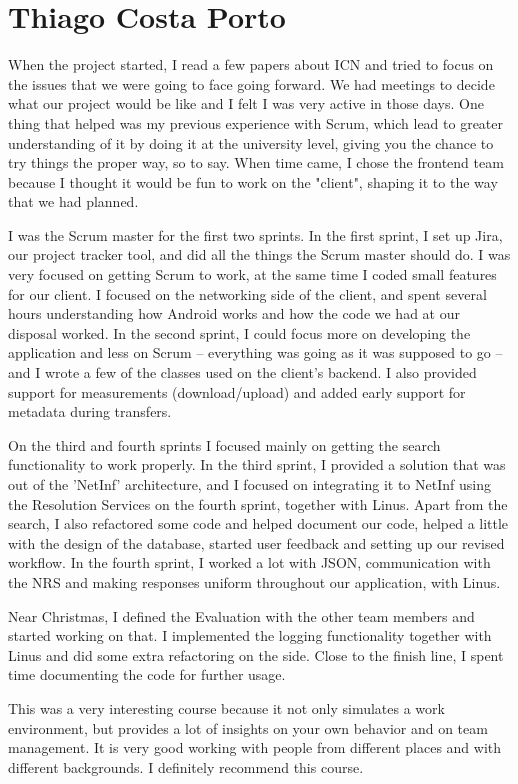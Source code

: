 \section{Thiago Costa Porto}
When the project started, I read a few papers about ICN and tried to focus on the issues that we were going to face going forward. We had meetings to decide what our project would be like and I felt I was very active in those days. One thing that helped was my previous experience with Scrum, which lead to greater understanding of it by doing it at the university level, giving you the chance to try things the proper way, so to say. When time came, I chose the frontend team because I thought it would be fun to work on the "client", shaping it to the way that we had planned.

I was the Scrum master for the first two sprints. In the first sprint, I set up Jira, our project tracker tool, and did all the things the Scrum master should do. I was very focused on getting Scrum to work, at the same time I coded small features for our client. I focused on the networking side of the client, and spent several hours understanding how Android works and how the code we had at our disposal worked. In the second sprint, I could focus more on developing the application and less on Scrum -- everything was going as it was supposed to go -- and I wrote a few of the classes used on the client's backend. I also provided support for measurements (download/upload) and added early support for metadata during transfers.

On the third and fourth sprints I focused mainly on getting the search functionality to work properly. In the third sprint, I provided a solution that was out of the 'NetInf' architecture, and I focused on integrating it to NetInf using the Resolution Services on the fourth sprint, together with Linus. Apart from the search, I also refactored some code and helped document our code, helped a little with the design of the database, started user feedback and setting up our revised workflow. In the fourth sprint, I worked a lot with JSON, communication with the NRS and making responses uniform throughout our application, with Linus.

Near Christmas, I defined the Evaluation with the other team members and started working on that. I implemented the logging functionality together with Linus and did some extra refactoring on the side. Close to the finish line, I spent time documenting the code for further usage.

This was a very interesting course because it not only simulates a work environment, but provides a lot of insights on your own behavior and on team management. It is very good working with people from different places and with different backgrounds. I definitely recommend this course.

